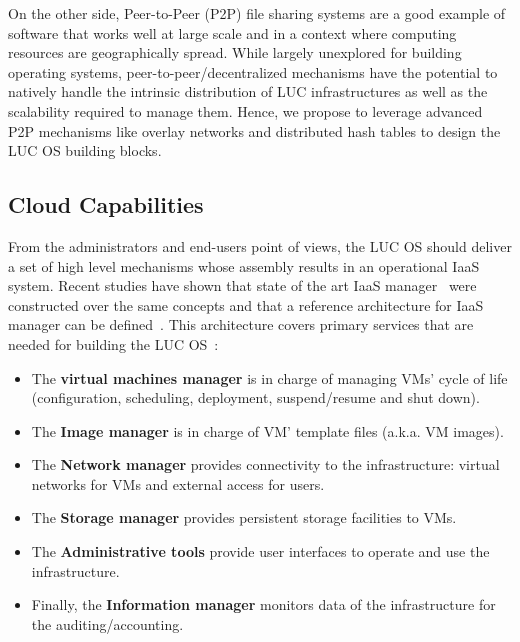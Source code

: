 \documentclass[conference]{IEEEtran}
\begin{document}
On the other side, Peer-to-Peer (P2P)
file sharing systems are a good example of software that works well at large scale and in
a context where computing resources are geographically spread.
While largely unexplored for building operating systems,
peer-to-peer/decentralized mechanisms have the potential to natively
handle the intrinsic distribution of LUC infrastructures as well as
the scalability required to manage them. Hence, we propose to leverage
advanced P2P mechanisms like overlay networks and distributed hash tables to design the
LUC OS building blocks.



\subsection{Cloud Capabilities}

From the administrators and end-users point of views, the LUC OS should deliver a set of
high level mechanisms whose assembly results in an operational IaaS system. Recent studies
have shown that state of the art IaaS manager~\cite{peng:2009} were constructed over the
same concepts and that a reference architecture for IaaS manager can be
defined~\cite{moreno2012iaas}.
This architecture covers primary services that are needed for building
the LUC OS~:
\begin{itemize}
\item The \textbf{virtual machines manager} is in charge of managing VMs' cycle of life
(configuration, scheduling, deployment, suspend/resume and shut down).
\item The \textbf{Image
  manager} is in charge of VM' template files (a.k.a. VM images).
\item The \textbf{Network
  manager} provides connectivity to the infrastructure: virtual networks for VMs and
external access for users.
\item The \textbf{Storage manager} provides persistent storage
facilities to VMs.
\item The \textbf{Administrative tools} provide user interfaces to operate
and use the infrastructure.
\item Finally, the \textbf{Information manager} monitors data of the
infrastructure for the auditing/accounting.
\end{itemize}
\end{document}
